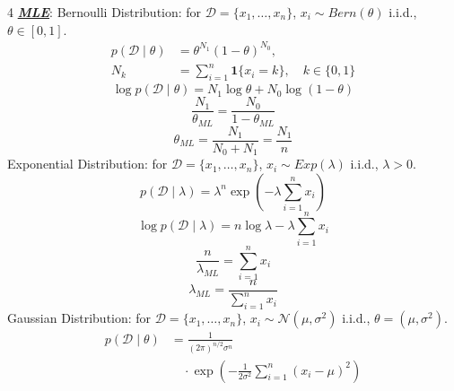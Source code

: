 \documentclass[12pt]{article}
\newcommand{\bulletPoint}[1]{\ul{\textit{\textbf{#1}}}}
\begin{document}
\begin{multicols*}{4}
\bulletPoint{MLE}:
Bernoulli Distribution: for $\mathcal{D}=\{x_1,\ldots,x_n\}$,
$x_i\sim Bern(\theta)$ i.i.d., $\theta\in[0,1]$.
\useshortskip \begin{equation*}
    \begin{split}
        p(\mathcal{D}\mid\theta)&=\theta^{N_1}(1-\theta)^{N_0},\\
        N_k&=\sum_{i=1}^{n}\mathbf{1}\{x_i=k\},\quad k\in\{0,1\}
    \end{split}
\end{equation*}
\useshortskip \begin{equation*}
    \log p(\mathcal{D}\mid\theta)=N_1\log\theta+N_0\log(1-\theta)
\end{equation*}
\useshortskip \begin{equation*}
    \frac{N_1}{\theta_{ML}}=\frac{N_0}{1-\theta_{ML}}
\end{equation*}
\useshortskip \begin{equation*}
    \theta_{ML}=\frac{N_1}{N_0+N_1}=\frac{N_1}{n}
\end{equation*}
Exponential Distribution: for $\mathcal{D}=\{x_1,\ldots,x_n\}$,
$x_i\sim Exp(\lambda)$ i.i.d., $\lambda>0$.
\useshortskip \begin{equation*}
    p(\mathcal{D}\mid\lambda)
    =\lambda^{n}\exp\!\left(-\lambda\sum_{i=1}^{n}x_i\right)
\end{equation*}
\useshortskip \begin{equation*}
    \log p(\mathcal{D}\mid\lambda)
    =n\log\lambda-\lambda\sum_{i=1}^{n}x_i
\end{equation*}
\useshortskip \begin{equation*}
    \frac{n}{\lambda_{ML}}=\sum_{i=1}^{n}x_i
\end{equation*}
\useshortskip \begin{equation*}
    \lambda_{ML}=\frac{n}{\sum_{i=1}^{n}x_i}
\end{equation*}
Gaussian Distribution: for $\mathcal{D}=\{x_1,\ldots,x_n\}$,
$x_i\sim \mathcal{N}(\mu,\sigma^2)$ i.i.d., $\theta=(\mu,\sigma^2)$.
\useshortskip \begin{equation*}
    \begin{split}
        p(\mathcal{D}\mid\theta)
        &=\frac{1}{(2\pi)^{n/2}\sigma^{n}} \\
        &\quad \cdot \exp\!\left(
        -\frac{1}{2\sigma^2}\sum_{i=1}^{n}(x_i-\mu)^2
        \right)
    \end{split}
\end{equation*}


\end{multicols*}
\end{document}
